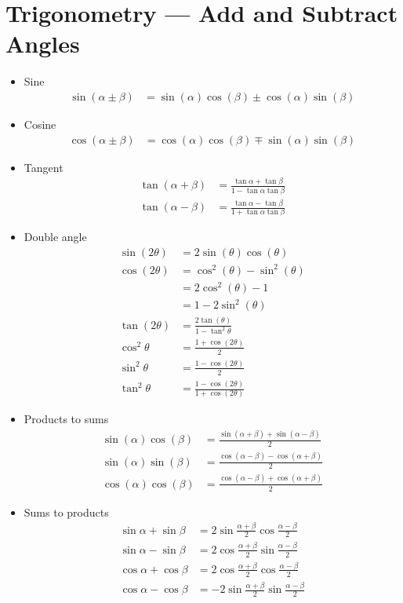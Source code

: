 \section{Trigonometry --- Add and Subtract Angles}\label{sec trig add}
\begin{itemize}
 \item Sine
\begin{align*}
  \sin(\alpha \pm \beta) &= \sin(\alpha)\cos(\beta) \pm \cos(\alpha)\sin(\beta)
  \end{align*}
 \item Cosine
\begin{align*}
  \cos(\alpha \pm \beta) &= \cos(\alpha)\cos(\beta) \mp \sin(\alpha)\sin(\beta)
\end{align*}
\item Tangent
\begin{align*}
\tan(\alpha+\beta)&=\frac{\tan\alpha+\tan\beta}{1-\tan\alpha\tan\beta} \\
\tan(\alpha-\beta)&=\frac{\tan\alpha-\tan\beta}{1+\tan\alpha\tan\beta}
\end{align*}
\item Double angle
\begin{align*}
  \sin(2\theta) &= 2\sin(\theta)\cos(\theta) \\
  \cos(2\theta) &= \cos^2(\theta) - \sin^2(\theta) \\
  &= 2\cos^2(\theta) - 1   \\
  &= 1 - 2\sin^2(\theta) \\
  \tan(2\theta) &= \frac{2\tan(\theta)}{1-\tan^2\theta} \\
\cos^2\theta&=\frac{1+\cos(2\theta)}{2} \\
\sin^2\theta&=\frac{1-\cos(2\theta)}{2} \\
\tan^2\theta&=\frac{1-\cos(2\theta)}{1+\cos(2\theta)}
\end{align*}
\item Products to sums
\begin{align*}
\sin(\alpha)\cos(\beta)&= \frac{\sin(\alpha+\beta) +  \sin(\alpha-\beta)}{2} \\
\sin(\alpha)\sin(\beta)&= \frac{\cos(\alpha-\beta) - \cos(\alpha+\beta)}{2}\\
\cos(\alpha)\cos(\beta)&= \frac{\cos(\alpha-\beta) + \cos(\alpha+\beta)}{2}
\end{align*}
\item Sums to products
\begin{align*}
\sin\alpha+\sin\beta 
           &= 2 \sin\frac{\alpha+\beta}{2}\cos\frac{\alpha-\beta}{2} \\
\sin\alpha-\sin\beta 
           &= 2 \cos\frac{\alpha+\beta}{2}\sin\frac{\alpha-\beta}{2} \\
\cos\alpha+\cos\beta  
           &= 2 \cos\frac{\alpha+\beta}{2}\cos\frac{\alpha-\beta}{2} \\
\cos\alpha-\cos\beta 
           &= -2 \sin\frac{\alpha+\beta}{2}\sin\frac{\alpha-\beta}{2}
\end{align*}

\end{itemize}

